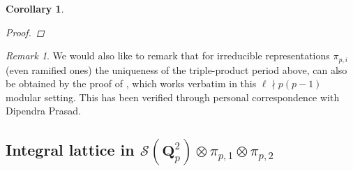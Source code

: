 \documentclass{amsart}%
\theoremstyle{plain}
\newtheorem{cor}[thm]{Corollary}
\theoremstyle{plain}
\theoremstyle{remark}
\newtheorem{rem}[thm]{Remark}
\begin{document}
\begin{cor}
\begin{proof}
     \end{proof}
 \end{cor}

       \begin{rem}
           We would also like to remark that for irreducible representations $\pi_{p,i}$ (even ramified ones) the uniqueness of the triple-product period above, can also be obtained by the proof of \cite{prasad1990trilinear}, which works verbatim in this $\ell\nmid p(p-1)$ modular setting. This has been verified through personal correspondence with Dipendra Prasad.
       \end{rem}

\subsection{Integral lattice in $\mathcal{S}(\mathbf{Q}_p^2)\otimes \pi_{p,1}\otimes \pi_{p,2}$}\label{sec in lattice in S x pi1 x pi2}
 
\end{document}
